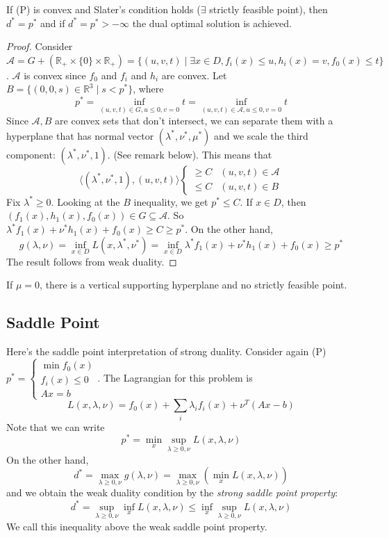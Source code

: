 \begin{thrm}
If (P) is convex and Slater's condition holds ($\exists$ strictly feasible point), then $d^* = p^*$ and if $d^* = p^* >-\infty$ the dual optimal solution is achieved.
\end{thrm}
\begin{proof}
Consider $\mathcal{A} = G + (\mathbb{R}_+ \times \{0 \} \times \mathbb{R}_+) = \{(u,v,t) \mid \exists x \in D, f_i(x) \le u, h_i(x) = v, f_0(x) \le t \}$. $\mathcal{A}$ is convex since $f_0$ and $f_i$ and $h_i$ are convex. Let $B = \{(0,0,s) \in \mathbb{R}^3 \mid s < p^* \}$, where 
\[
p^* = \inf \limits_{(u,v,t) \in G, u \le 0, v=0} t
= \inf \limits_{(u,v,t) \in \mathcal{A}, u \le 0, v=0} t
\]
Since $\mathcal{A}, B$ are convex sets that don't intersect, we can separate them with a hyperplane that has normal vector $(\lambda^* , \nu^*, \mu^*)$ and we scale the third component: $(\lambda^*, \nu^*, 1)$. (See remark below). This means that
\[
\langle (\lambda^*, \nu^*, 1), (u,v,t ) \rangle \begin{cases}
\ge C & (u,v,t) \in \mathcal{A} \\
\le C & (u,v,t) \in B
\end{cases}
\]
Fix $\lambda^* \ge 0$. Looking at the $B$ inequality, we get $p^* \le C $. If $x \in D$, then $(f_1(x), h_1(x), f_0(x)) \in G \subseteq \mathcal{A}$. So $\lambda^* f_1(x) + \nu^* h_1(x) + f_0(x) \ge C \ge p^*$. On the other hand,
\[
g(\lambda,\nu) = \inf \limits_{x \in D} L(x,\lambda^*,\nu^*) = \inf \limits_{x \in D} \lambda^* f_1(x) + \nu^* h_1(x) + f_0(x) \ge p^*
\]
The result follows from weak duality.
\end{proof}

\begin{rem}
If $\mu=0$, there is a vertical supporting hyperplane and no strictly feasible point.
\end{rem}


\subsection{Saddle Point}
Here's the saddle point interpretation of strong duality. Consider again (P)
$p^*=\begin{cases} \min f_0(x) \\ f_i(x) \le 0 \\ Ax =b \end{cases}$. The Lagrangian for this problem is
\[
L(x,\lambda,\nu) = f_0(x) + \sum_i \lambda_i f_i(x) + \nu^T (Ax-b)
\]
Note that we can write
\[ p^* = \min \limits_x \sup \limits_{\lambda \ge 0, \nu} L(x,\lambda,\nu)
\]
On the other hand,
\[
d^* = \max \limits_{\lambda \ge 0, \nu} g(\lambda,\nu) = \max \limits_{\lambda \ge 0, \nu} \left( \min \limits_{x} L(x,\lambda,\nu) \right)
\]
and we obtain the weak duality condition by the {\it strong saddle point property}:
\[
d^* = \sup \limits_{\lambda \ge 0, \nu} \inf \limits_x L(x,\lambda,\nu) \le \inf \limits_x \sup \limits_{\lambda \ge 0, \nu} L(x,\lambda,\nu)
\]
We call this inequality above the weak saddle point property.


